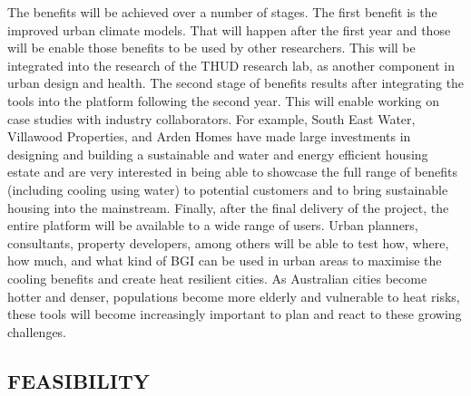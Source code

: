 The benefits will be achieved over a number of stages. The first benefit is the improved urban climate models. That will happen after the first year and those will be enable those benefits to be used by other researchers. This will be integrated into the research of the THUD research lab, as another component in urban design and health. The second stage of benefits results after integrating the tools into the platform following the second year. This will enable working on case studies with industry collaborators. For example, South East Water, Villawood Properties, and Arden Homes have made large investments in designing and building a sustainable and water and energy efficient housing estate and are very interested in being able to showcase the full range of benefits (including cooling using water) to potential customers and to bring sustainable housing into the mainstream. Finally, after the final delivery of the project, the entire platform will be available to a wide range of users. Urban planners, consultants, property developers, among others will be able to test how, where, how much, and what kind of BGI can be used in urban areas to maximise the cooling benefits and create heat resilient cities. As Australian cities become hotter and denser, populations become more elderly and vulnerable to heat risks, these tools will become increasingly important to plan and react to these growing challenges.

\subsection*{\TitleFont FEASIBILITY}



